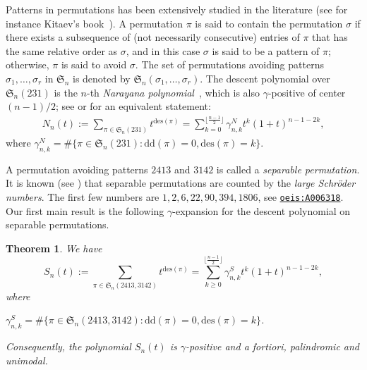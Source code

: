 \documentclass[12pt]{amsart}
\numberwithin{equation}{section}
\theoremstyle{plain}
\newtheorem{theorem}{Theorem}[section]
\theoremstyle{definition}
\def\dd{\mathrm{dd}}
\def\des{\mathrm{des}}
\def\S{\mathfrak{S}}
\begin{document}
Patterns in permutations has been extensively studied in the literature (see for instance
Kitaev's book~\cite{ki}). 
A permutation $\pi$ is said to contain the permutation $\sigma$  if there exists a subsequence of (not necessarily consecutive) entries of $\pi$ that has the same relative order as $\sigma$, and in this case $\sigma$ is said to be a pattern of $\pi$; otherwise, 
$\pi$ is said to avoid  $\sigma$.  The set of permutations avoiding patterns
$\sigma_1, \ldots, \sigma_r$ in $\S_n$ is denoted by $\S_n(\sigma_1, \ldots, \sigma_r)$.
The descent polynomial over $\S_n(231)$ is the $n$-th 
 {\em Narayana polynomial}~\cite[Chapter 2]{Pet},  which 
 is also $\gamma$-positive of center $(n-1)/2$; see \cite[Theorem 4.2]{Pet} or \cite[Proposition 11.14]{prw} for an equivalent statement:
\begin{align}\label{Nara}
N_n(t):=\sum_{\pi\in \S_n(231)} t^{\des(\pi)}=\sum_{k=0}^{\lfloor\frac{n-1}{2}\rfloor}\gamma_{n,k}^N t^k(1+t)^{n-1-2k},
\end{align}
 where  $\gamma_{n,k}^N=\#\{\pi\in \S_n(231): \dd(\pi)=0,  \des(\pi)=k\}$. 
 
A  permutation avoiding patterns $2413$ and $3142$ is called a 
 \emph{separable permutation}. 
It is known (see \cite{sh,we}) that separable permutations are counted by the \emph{large Schr\"oder numbers}.  The first few numbers are $1,2,6,22,90,394,1806$, see \href{http://oeis.org/A006318}{\tt{oeis:A006318}}. Our first main result is the following $\gamma$-expansion for the descent polynomial on separable permutations.

\begin{theorem}\label{gamma:s} We have 
\begin{equation}\label{gam:scho}
S_n(t):=\sum_{\pi\in\S_n(2413,3142)}t^{\des(\pi)} =\sum_{k\geq 0}^{\lfloor\frac{n-1}{2}\rfloor}\gamma_{n,k}^S t^k (1+t)^{n-1-2k},
\end{equation}
where 

$\gamma_{n,k}^S=\#\{\pi \in \S_n(2413, 3142): \dd(\pi)=0, \des(\pi)=k\}$.

Consequently, the polynomial $S_n(t)$ is $\gamma$-positive and a fortiori, palindromic and unimodal.
\end{theorem}
\end{document}
